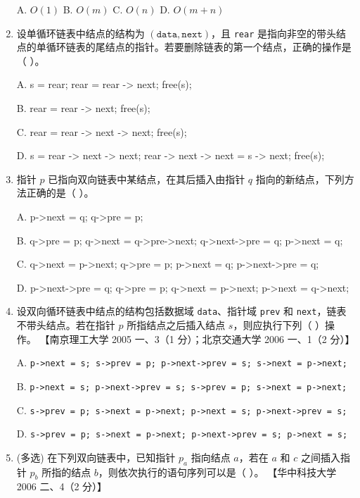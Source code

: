 \documentclass[lang=cn,newtx,10pt,scheme=chinese]{elegantbook}
\begin{document}
\begin{enumerate}
    A. $O(1)$ \quad B. $O(m)$ \quad C. $O(n)$ \quad D. $O(m+n)$  

    \item 设单循环链表中结点的结构为 $(\texttt{data}, \texttt{next})$，且 \texttt{rear} 是指向非空的带头结点的单循环链表的尾结点的指针。若要删除链表的第一个结点，正确的操作是（ ）。  
    
    A. s = rear; rear = rear -> next; free(s);

    B. rear = rear -> next; free(s);

    C. rear = rear -> next -> next; free(s);

    D. s = rear -> next -> next; rear -> next -> next = s -> next; free(s);

    \item 指针 $p$ 已指向双向链表中某结点，在其后插入由指针 $q$ 指向的新结点，下列方法正确的是（ ）。  
    
    A. p->next = q; q->pre = p;
    
    B. q->pre = p; q->next = q->pre->next; q->next->pre = q; p->next = q;
   
    C. q->next = p->next; q->pre = p; p->next = q; p->next->pre = q;
   
    D. p->next->pre = q; q->pre = p; q->next = p->next; p->next = q->next;

    \item 设双向循环链表中结点的结构包括数据域 \texttt{data}、指针域 \texttt{prev} 和 \texttt{next}，链表不带头结点。若在指针 $p$ 所指结点之后插入结点 $s$，则应执行下列（ ）操作。  
    【南京理工大学 2005 一、3（1 分）；北京交通大学 2006 一、1（2 分）】 

    A. \texttt{p->next = s; s->prev = p; p->next->prev = s; s->next = p->next;} 

    B. \texttt{p->next = s; p->next->prev = s; s->prev = p; s->next = p->next;} 

    C. \texttt{s->prev = p; s->next = p->next; p->next = s; p->next->prev = s;}  

    D. \texttt{s->prev = p; s->next = p->next; p->next->prev = s; p->next = s;}  

    \item (多选) 在下列双向链表中，已知指针 $p_a$ 指向结点 $a$，若在 $a$ 和 $c$ 之间插入指针 $p_b$ 所指的结点 $b$，则依次执行的语句序列可以是（ ）。  
    【华中科技大学 2006 二、4（2 分）】  


\end{enumerate}
\end{document}
